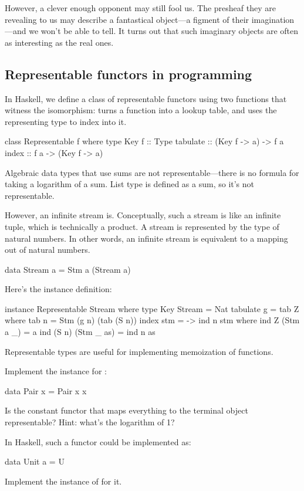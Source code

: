 \documentclass[DaoFP]{subfiles}
\begin{document}
However, a clever enough opponent may still fool us. The presheaf they are revealing to us may describe a fantastical object---a figment of their imagination---and we won't be able to tell. It turns out that such imaginary objects are often as interesting as the real ones. 

\subsection{Representable functors in programming}

In Haskell, we define a class of representable functors using two functions that witness the isomorphism:  turns a function into a lookup table, and  uses the representing type  to index into it.

\begin{haskell}
class Representable f where
  type Key f :: Type
  tabulate :: (Key f -> a) -> f a
  index    :: f a -> (Key f -> a)
\end{haskell}

Algebraic data types that use sums are not representable---there is no formula for taking a logarithm of a sum. List type is defined as a sum, so it's not representable. 

However, an infinite stream is. Conceptually, such a stream is like an infinite tuple, which is technically a product. A stream is represented by the type of natural numbers. In other words, an infinite stream is equivalent to a mapping out of natural numbers. 
\begin{haskell}
data Stream a = Stm a (Stream a)
\end{haskell}
Here's the instance definition:
\begin{haskell}
instance Representable Stream where
  type Key Stream = Nat
  tabulate g = tab Z
    where
      tab n = Stm (g n) (tab (S n))
  index stm = \n -> ind n stm
    where
      ind Z (Stm a _) = a
      ind (S n) (Stm _ as) = ind n as
\end{haskell}
Representable types are useful for implementing memoization of functions.

\begin{exercise}
Implement the  instance for :
\begin{haskell}
data Pair x = Pair x x
\end{haskell}
\end{exercise}

\begin{exercise}
Is the constant functor that maps everything to the terminal object representable? Hint: what's the logarithm of 1?

In Haskell, such a functor could be implemented as:
\begin{haskell}
data Unit a = U
\end{haskell}
Implement the instance of  for it.
\end{exercise}
\end{document}

